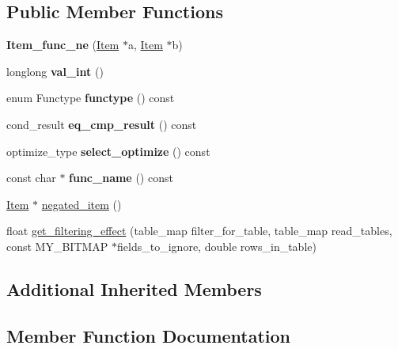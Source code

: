 \subsection*{Public Member Functions}
\begin{DoxyCompactItemize}
\item 
\mbox{\label{classItem__func__ne_af54b02e65d6cbd3d1134bba003cfa0be}} 
{\bfseries Item\+\_\+func\+\_\+ne} (\mbox{\hyperlink{classItem}{Item}} $\ast$a, \mbox{\hyperlink{classItem}{Item}} $\ast$b)
\item 
\mbox{\label{classItem__func__ne_a63de0a859ec08e94cbfc27c7bac0bb34}} 
longlong {\bfseries val\+\_\+int} ()
\item 
\mbox{\label{classItem__func__ne_a39bfa3bc4d4f7f662677b4a0390effa5}} 
enum Functype {\bfseries functype} () const
\item 
\mbox{\label{classItem__func__ne_aeade08422973bcba97c5fa9e082954ac}} 
cond\+\_\+result {\bfseries eq\+\_\+cmp\+\_\+result} () const
\item 
\mbox{\label{classItem__func__ne_a3e0babd5194c73ae9cce124468cbd584}} 
optimize\+\_\+type {\bfseries select\+\_\+optimize} () const
\item 
\mbox{\label{classItem__func__ne_a6c747f01e12b63e055bddab49e6bff8f}} 
const char $\ast$ {\bfseries func\+\_\+name} () const
\item 
\mbox{\hyperlink{classItem}{Item}} $\ast$ \mbox{\hyperlink{classItem__func__ne_a2ea1a7165722dac5d173f1cff8b920ef}{negated\+\_\+item}} ()
\item 
float \mbox{\hyperlink{classItem__func__ne_a0f99e61ddf29602bc36b419068b44d11}{get\+\_\+filtering\+\_\+effect}} (table\+\_\+map filter\+\_\+for\+\_\+table, table\+\_\+map read\+\_\+tables, const M\+Y\+\_\+\+B\+I\+T\+M\+AP $\ast$fields\+\_\+to\+\_\+ignore, double rows\+\_\+in\+\_\+table)
\end{DoxyCompactItemize}
\subsection*{Additional Inherited Members}


\subsection{Member Function Documentation}
\mbox{\label{classItem__func__ne_a0f99e61ddf29602bc36b419068b44d11}} 
